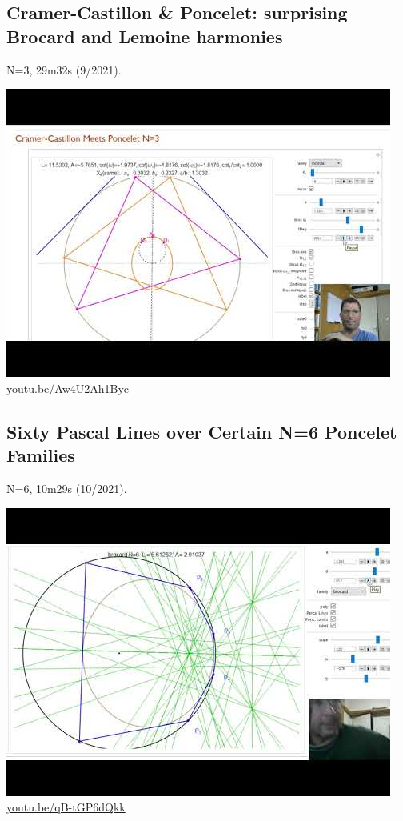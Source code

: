 \documentclass[12pt]{amsart}
\begin{document}
\subsection{Cramer-Castillon \& Poncelet: surprising Brocard and Lemoine harmonies}
\label{vid:Aw4U2Ah1Byc}
\noindent N=3, 29m32s (9/2021). 
\begin{center}\includegraphics[width=.5\textwidth]{pics/Aw4U2Ah1Byc.jpg} \\ 
\href{https://youtu.be/Aw4U2Ah1Byc}{\url{youtu.be/Aw4U2Ah1Byc}}\end{center}
% 

\subsection{Sixty Pascal Lines over Certain N=6 Poncelet Families}
\label{vid:qB-tGP6dQkk}
\noindent N=6, 10m29s (10/2021). 
\begin{center}\includegraphics[width=.5\textwidth]{pics/qB-tGP6dQkk.jpg} \\ 
\href{https://youtu.be/qB-tGP6dQkk}{\url{youtu.be/qB-tGP6dQkk}}\end{center}
% 
\end{document}

